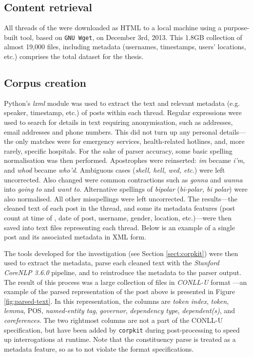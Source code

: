\subsection{Content retrieval}

All \glspl{thread} of the  were downloaded as \gls{HTML} to a local machine using a purpose\hyp{}built tool, based on \texttt{GNU Wget}, on December 3rd, 2013. This 1.8GB collection of almost 19,000 files, including metadata (usernames, timestamps, users' locations, etc.) comprises the total dataset for the thesis.

\subsection{Corpus creation}

Python's \emph{lxml} module was used to extract the text and relevant metadata (e.g. speaker, timestamp, etc.) of \glspl{post} within each \gls{thread}. Regular expressions were used to search for details in text requiring anonymisation, such as addresses, email addresses and phone numbers. This did not turn up any personal details---the only matches were for emergency services, health\hyp{}related hotlines, and, more rarely, specific hospitals. For the sake of parser accuracy, some basic spelling normalisation was then performed. Apostrophes were reinserted: \emph{im} became \emph{i'm}, and \emph{whod} became \emph{who'd}. Ambiguous cases (\emph{shell, hell, wed, etc.}) were left uncorrected. Also changed were common contractions such as \emph{gonna} and \emph{wanna} into \emph{going to} and \emph{want to}. Alternative spellings of \emph{bipolar} (\emph{bi-polar, bi polar}) were also normalised. All other misspellings were left uncorrected. The results---the cleaned text of each post in the thread, and some its metadata features (\gls{post} count at time of , date of \gls{post}, username, gender, location, etc.)---were then saved into text files representing each \gls{thread}. Below is an example of a single \gls{post} and its associated metadata in \gls{XML} form.


%
\noindent The tools developed for the investigation (see Section \ref{sect:corpkit}) were then used to extract the metadata, parse each cleaned text with the \emph{Stanford CoreNLP 3.6.0} pipeline, and to reintroduce the metadata to the parser output. The result of this process was a large collection of files in \emph{CONLL\hyp{}U} format \cite{nivre_towards_2015}---an example of the parsed representation of the \gls{post} above is presented in Figure \ref{fig:parsed-text}. In this representation, the columns are \emph{token index}, \emph{token}, \emph{lemma}, \gls{POS}, \emph{named\hyp{}entity tag}, \emph{governor}, \emph{dependency type}, \emph{dependent(s)}, and \emph{coreferences}. The two rightmost columns are not a part of the CONLL\hyp{}U specification, but have been added by \texttt{corpkit} during post\hyp{}processing to speed up interrogations at runtime. Note that the constituency parse is treated as a metadata feature, so as to not violate the format specifications.

